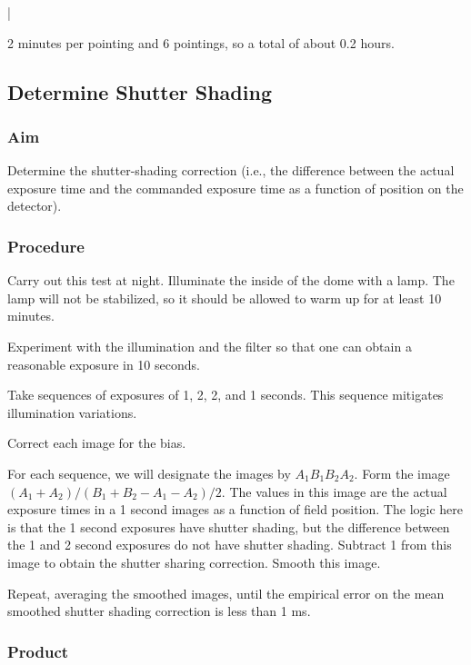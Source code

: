|\documentclass{article}
\begin{document}
2 minutes per pointing and 6 pointings, so a total of about 0.2 hours.


\subsection{Determine Shutter Shading}

\subsubsection{Aim}

Determine the shutter-shading correction (i.e., the difference between the actual exposure time and the commanded exposure time as a function of position on the detector).

\subsubsection{Procedure}

Carry out this test at night. Illuminate the inside of the dome with a lamp. The lamp will not be stabilized, so it should be allowed to warm up for at least 10 minutes.

Experiment with the illumination and the filter so that one can obtain a reasonable exposure in 10 seconds.

Take sequences of exposures of 1, 2, 2, and 1 seconds. This sequence mitigates illumination variations.

Correct each image for the bias.

For each sequence, we will designate the images by $A_1B_1B_2A_2$.
Form the image $(A_1+A_2)/(B_1+B_2-A_1-A_2)/2$. The values in this image are the actual exposure times in a 1 second images as a function of field position. The logic here is that the 1 second exposures have shutter shading, but the difference between the 1 and 2 second exposures do not have shutter shading. Subtract 1 from this image to obtain the shutter sharing correction. Smooth this image.

Repeat, averaging the smoothed images, until the empirical error on the mean smoothed shutter shading correction is less than 1 ms.

\subsubsection{Product}
\end{document}
